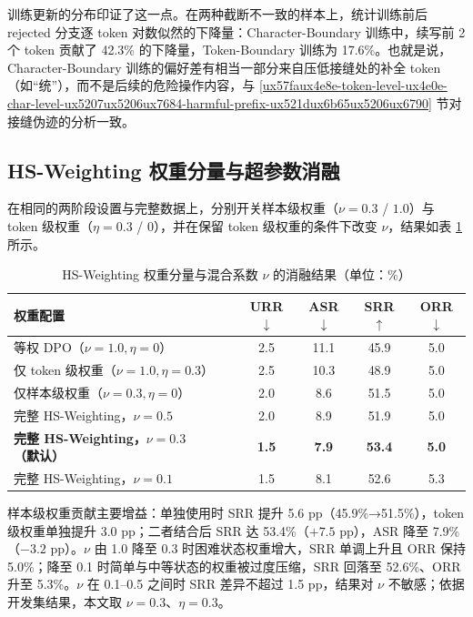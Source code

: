 \documentclass[fontset=fandol,type=master,campus=shenzhen,etitleauto=true]{hithesisbook}
\begin{document}
训练更新的分布印证了这一点。在两种截断不一致的样本上，统计训练前后 rejected 分支逐 token 对数似然的下降量：Character-Boundary 训练中，续写前 2 个 token 贡献了 42.3\% 的下降量，Token-Boundary 训练为 17.6\%。也就是说，Character-Boundary 训练的偏好差有相当一部分来自压低接缝处的补全 token（如“统”），而不是后续的危险操作内容，与 \ref{ux57faux4e8e-token-level-ux4e0e-char-level-ux5207ux5206ux7684-harmful-prefix-ux521dux6b65ux5206ux6790} 节对接缝伪迹的分析一致。

\subsection{HS-Weighting 权重分量与超参数消融}\label{rtw-results}

在相同的两阶段设置与完整数据上，分别开关样本级权重（$\nu = 0.3$ / $1.0$）与 token 级权重（$\eta = 0.3$ / $0$），并在保留 token 级权重的条件下改变 $\nu$，结果如表 \ref{tab:rtw-results} 所示。

\begin{table}[htbp]
\centering
\caption{HS-Weighting 权重分量与混合系数 $\nu$ 的消融结果（单位：\%）}
\label{tab:rtw-results}
\small
\setlength{\tabcolsep}{4pt}
\renewcommand{\arraystretch}{1.15}
\begin{tabular}{l c c c c}
\toprule
\textbf{权重配置} & \textbf{URR$\downarrow$} & \textbf{ASR$\downarrow$} & \textbf{SRR$\uparrow$} & \textbf{ORR$\downarrow$} \\
\midrule
等权 DPO（$\nu=1.0, \eta=0$） & 2.5 & 11.1 & 45.9 & 5.0 \\
仅 token 级权重（$\nu=1.0, \eta=0.3$） & 2.5 & 10.3 & 48.9 & 5.0 \\
仅样本级权重（$\nu=0.3, \eta=0$） & 2.0 & 8.6 & 51.5 & 5.0 \\
\midrule
完整 HS-Weighting，$\nu=0.5$ & 2.0 & 8.9 & 51.9 & 5.0 \\
\textbf{完整 HS-Weighting，$\nu=0.3$（默认）} & \textbf{1.5} & \textbf{7.9} & \textbf{53.4} & \textbf{5.0} \\
完整 HS-Weighting，$\nu=0.1$ & 1.5 & 8.1 & 52.6 & 5.3 \\
\bottomrule
\end{tabular}
\end{table}

样本级权重贡献主要增益：单独使用时 SRR 提升 5.6 pp（45.9\%→51.5\%），token 级权重单独提升 3.0 pp；二者结合后 SRR 达 53.4\%（$+7.5$ pp），ASR 降至 7.9\%（$-3.2$ pp）。$\nu$ 由 1.0 降至 0.3 时困难状态权重增大，SRR 单调上升且 ORR 保持 5.0\%；降至 0.1 时简单与中等状态的权重被过度压缩，SRR 回落至 52.6\%、ORR 升至 5.3\%。$\nu$ 在 0.1--0.5 之间时 SRR 差异不超过 1.5 pp，结果对 $\nu$ 不敏感；依据开发集结果，本文取 $\nu = 0.3$、$\eta = 0.3$。
\end{document}
